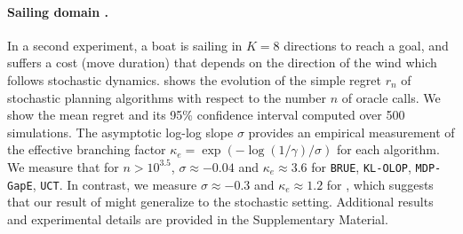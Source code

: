 \paragraph{Sailing domain \citep{Vanderbei1996}.}
In a second experiment, a boat is sailing in $K=8$ directions to reach a goal, and suffers a cost (move duration) that depends on the direction of the wind which follows stochastic dynamics.  shows the evolution of the simple regret $r_n$ of stochastic planning algorithms with respect to the number $n$ of oracle calls. We show the mean regret and its 95\% confidence interval computed over 500 simulations. The asymptotic log-log slope $\sigma$ provides an empirical measurement of the effective branching factor $\kappa_e = \exp(-\log(1/\gamma)/\sigma)$ for each algorithm. We measure that for $n>10^{3.5}$, $\sigma \approx-0.04$ and $\kappa_e \approx 3.6$ for \texttt{BRUE}, \texttt{KL-OLOP}, \texttt{MDP-GapE}, \texttt{UCT}. In contrast, we measure $\sigma \approx-0.3$ and $\kappa_e \approx 1.2$ for \GBOP, which suggests that our result of  might generalize to the stochastic setting. Additional results and experimental details are provided in the Supplementary Material.

